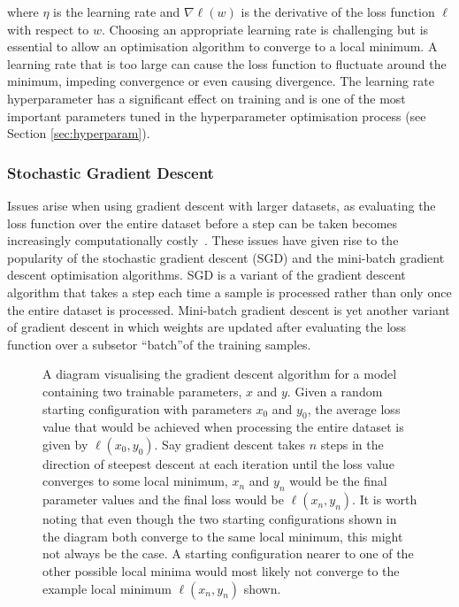 \noindent
where $\eta$ is the learning rate and $\nabla\ell(w)$ is the derivative of the loss function $\ell$ with respect to $w$. Choosing an appropriate learning rate is challenging but is essential to allow an optimisation algorithm to converge to a local minimum. A learning rate that is too large can cause the loss function to fluctuate around the minimum, impeding convergence or even causing divergence. The learning rate hyperparameter has a significant effect on training and is one of the most important parameters tuned in the hyperparameter optimisation process (see Section \ref{sec:hyperparam}).


\subsubsection{Stochastic Gradient Descent}

Issues arise when using gradient descent with larger datasets, as evaluating the loss function over the entire dataset before a step can be taken becomes increasingly computationally costly~\cite{gdbad}. These issues have given rise to the popularity of the stochastic gradient descent (SGD) and the mini-batch gradient descent optimisation algorithms. SGD is a variant of the gradient descent algorithm that takes a step each time a sample is processed rather than only once the entire dataset is processed. Mini-batch gradient descent is yet another variant of gradient descent in which weights are updated after evaluating the loss function over a subset\textemdash or ``batch''\textemdash of the training samples.

\begin{figure}[t]
    \centering
    
    \caption{A diagram visualising the gradient descent algorithm for a model containing two trainable parameters, $x$ and $y$. Given a random starting configuration with parameters $x_0$ and $y_0$, the average loss value that would be achieved when processing the entire dataset is given by $\ell(x_0, y_0)$. Say gradient descent takes $n$ steps in the direction of steepest descent at each iteration until the loss value converges to some local minimum, $x_n$ and $y_n$ would be the final parameter values and the final loss would be $\ell(x_n, y_n)$. It is worth noting that even though the two starting configurations shown in the diagram both converge to the same local minimum, this might not always be the case. A starting configuration nearer to one of the other possible local minima would most likely not converge to the example local minimum $\ell(x_n, y_n)$ shown.}
    \label{fig:gd}
\end{figure}

